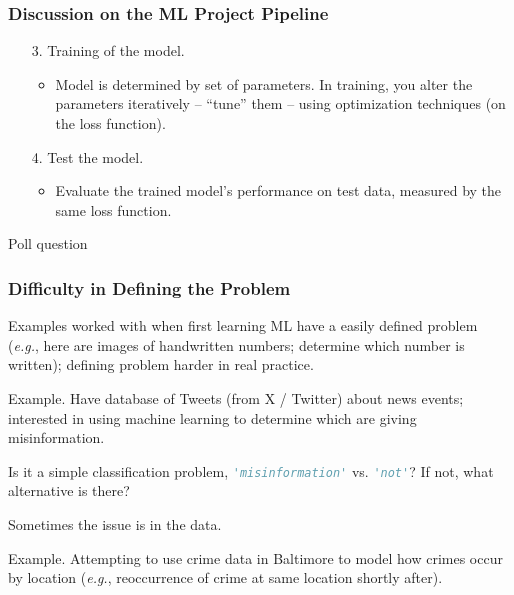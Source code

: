 \documentclass{beamer}
\newenvironment{codeblock}
    {\hfill\begin{beamerboxesrounded}[lower=codecol, width=0.8\textwidth]
    \medskip

    }
    { 
    \end{beamerboxesrounded}\hfill
    }
\theoremstyle{example}
\newcommand{\st}[1]{\lstinline[language=Python,basicstyle=\ttfamily,stringstyle=\small\color{strings}]!#1!}
\newcommand{\gnum}[1]{{\color{mygreen}#1.}}
\begin{document}
\begin{frame}
\frametitle{Discussion on the ML Project Pipeline}
    \begin{enumerate}
        \item[\gnum{3}] Training of the model.%
        \begin{itemize}
            \item Model is determined by set of parameters. In training, you alter the parameters iteratively {--} ``tune'' them {--} using optimization techniques (on the loss function).
        \end{itemize}
        \item[\gnum{4}] Test the model.
        \begin{itemize}
            \item Evaluate the trained model's performance on test data, measured by the same loss function.
        \end{itemize}
    \end{enumerate}
\end{frame}

\begin{frame}[standout]
    Poll question
\end{frame}

\begin{frame}
\frametitle{Difficulty in Defining the Problem}
    Examples worked with when first learning ML have a easily defined problem (\textit{e.g.}, here are images of handwritten numbers; determine which number is written); defining problem harder in real practice.  
    \pause

    \begin{codeblock}
        \textcolor{mygreen}{Example.} Have database of Tweets (from X / Twitter) about news events; interested in using machine learning to determine which are giving misinformation.

        Is it a simple classification problem, {\small\st{'misinformation'}} vs. {\small\st{'not'}}? If not, what alternative is there?
    \end{codeblock}

    Sometimes the issue is in the data. 
    
    \begin{codeblock}
        \textcolor{mygreen}{Example.} Attempting to use crime data in Baltimore to model how crimes occur by location (\textit{e.g.}, reoccurrence of crime at same location shortly after).
    \end{codeblock}

\end{frame}
\end{document}
